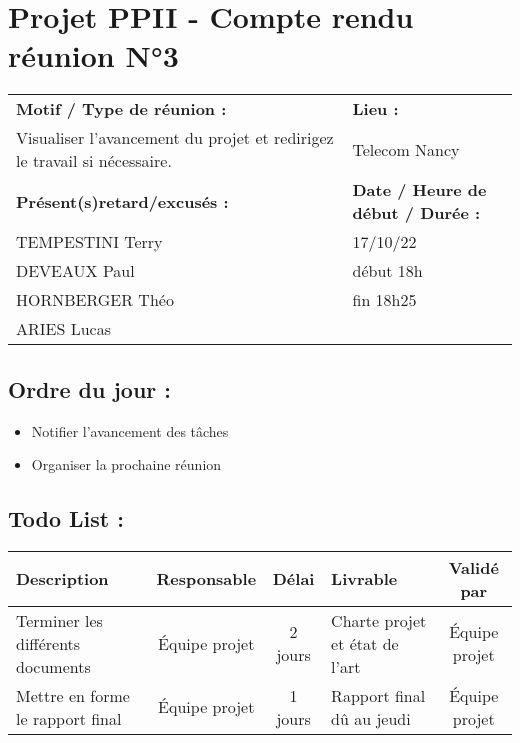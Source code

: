 \documentclass{article}
\begin{document}
\section*{Projet PPII - Compte rendu réunion N°3}
\begin{tabular}{|p{7cm}|p{6cm}|}
    \hline
    \textbf{Motif / Type de réunion :}
    & \textbf{Lieu :}
    \\
    Visualiser l'avancement du projet et redirigez le travail si nécessaire.
    & 
    Telecom Nancy
    \\ \hline
    \textbf{Présent(s)retard/excusés :}
    &
    \textbf{Date / Heure de début / Durée :}
    \\ 
    TEMPESTINI Terry &  17/10/22\\  
    DEVEAUX Paul & début 18h\\
    HORNBERGER Théo & fin 18h25\\
    ARIES Lucas & 
    \\ \hline
\end{tabular}

\subsection*{Ordre du jour :}
\begin{itemize}
    \item{Notifier l'avancement des tâches}
    \item{Organiser la prochaine réunion}
\end{itemize}

\subsection*{Todo List :}
\begin{tabular}{|p{3.5cm}|c|c|p{4.5cm}|c|}
    \hline 
    Description & Responsable & Délai & Livrable & Validé par 
    \\ \hline
    Terminer les différents documents & Équipe projet & 2 jours & Charte projet et état de l'art & Équipe projet
    \\ \hline
    Mettre en forme le rapport final & Équipe projet & 1 jours & Rapport final dû au jeudi & Équipe projet
    \\ \hline
\end{tabular}
\end{document}
